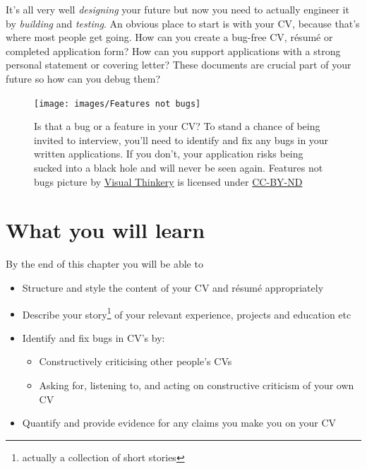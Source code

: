 \documentclass[
]{book}
\providecommand{\tightlist}{%
  \setlength{\itemsep}{0pt}\setlength{\parskip}{0pt}}
\begin{document}
It's all very well \emph{designing} your future but now you need to actually engineer it by \emph{building} and \emph{testing}. An obvious place to start is with your CV, because that's where most people get going. How can you create a bug-free CV, résumé or completed application form? How can you support applications with a strong personal statement or covering letter? These documents are crucial part of your future so how can you debug them? 🐛

\begin{figure}

{\centering \texttt{[image: images/Features not bugs]} 

}

\caption{Is that a bug or a feature in your CV? To stand a chance of being invited to interview, you'll need to identify and fix any bugs in your written applications. If you don't, your application risks being sucked into a black hole and will never be seen again. Features not bugs picture by \href{https://visualthinkery.com}{Visual Thinkery} is licensed under \href{https://creativecommons.org/licenses/by-nd/4.0/}{CC-BY-ND}}\label{fig:bugfeature-fig}
\end{figure}



\hypertarget{ilo7}{%
\section{What you will learn}\label{ilo7}}

By the end of this chapter you will be able to

\begin{itemize}
\tightlist
\item
  Structure and style the content of your CV and résumé appropriately
\item
  Describe your story\footnote{actually a collection of short stories} of your relevant experience, projects and education etc
\item
  Identify and fix bugs in CV's by:

  \begin{itemize}
  \tightlist
  \item
    Constructively criticising other people's CVs
  \item
    Asking for, listening to, and acting on constructive criticism of your own CV
  \end{itemize}
\item
  Quantify and provide evidence for any claims you make you on your CV
\end{itemize}
\end{document}
